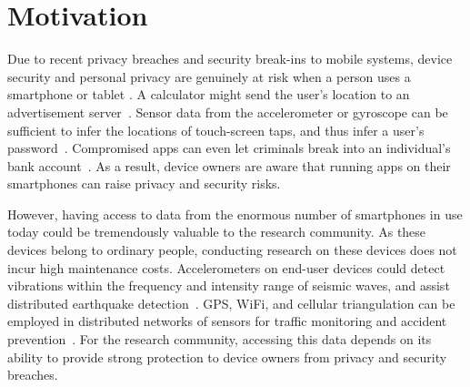 \section{Motivation}\label{sec-motivation}

Due to recent privacy breaches and security break-ins to mobile systems, 
device security and personal privacy are genuinely at risk when a person 
uses a smartphone or tablet \cite{breach}. 
A calculator might send the user's location to an advertisement 
server~\cite{calc}. Sensor data from the accelerometer 
or gyroscope can be sufficient to infer the locations of touch-screen 
taps, and thus infer a user's password~\cite{cai2011touchlogger}.
Compromised apps can even let criminals break into an individual's 
bank account~\cite{starbucks}. As a result, device owners 
are aware that running apps on their smartphones can raise privacy 
and security risks. 

However, having access to data from the enormous number of smartphones 
in use today could be tremendously valuable to the research 
community. As these devices belong to ordinary people, conducting
research on these devices does not incur high maintenance costs. 
Accelerometers on end-user devices could detect vibrations within 
the frequency and intensity range of seismic waves, and assist 
distributed earthquake detection~\cite{faulkner2011next}. GPS, 
WiFi, and cellular triangulation can be employed in distributed 
networks of sensors for traffic monitoring and accident 
prevention~\cite{mohan2008nericell, thiagarajan2009vtrack}. 
For the research community, accessing this data depends on its 
ability to provide strong protection to device owners from privacy 
and security breaches.

